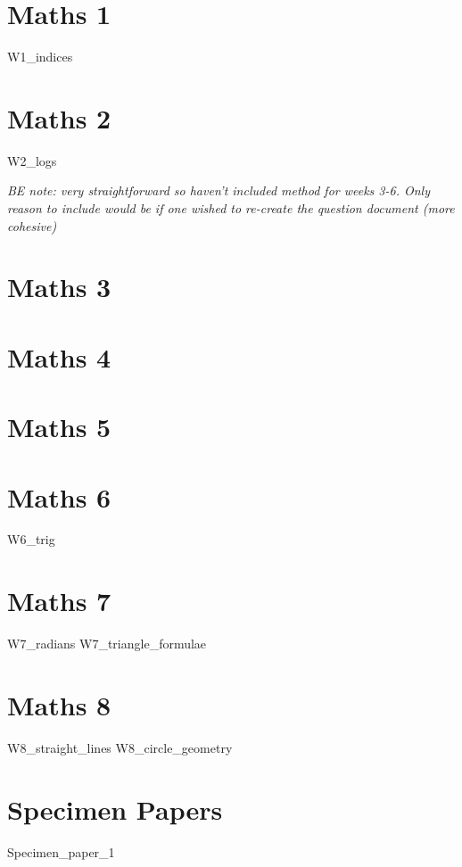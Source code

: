 \documentclass[12pt]{exam}
\begin{document}
\tableofcontents
\newpage

\section{Maths 1}
{W1_indices}

\newpage
\section{Maths 2}
{W2_logs}

\newpage
\textit{BE note: very straightforward so haven't included method for weeks 3-6.
Only reason to include would be if one wished to re-create the question 
document (more cohesive)}
\section{Maths 3}
\section{Maths 4}
\section{Maths 5}
\section{Maths 6}
{W6_trig}

\newpage
\section{Maths 7}
{W7_radians}
\newpage
{W7_triangle_formulae}

\newpage
\section{Maths 8}
{W8_straight_lines}
\newpage
{W8_circle_geometry}

\newpage
\section{Specimen Papers}
{Specimen_paper_1}
\end{document}
